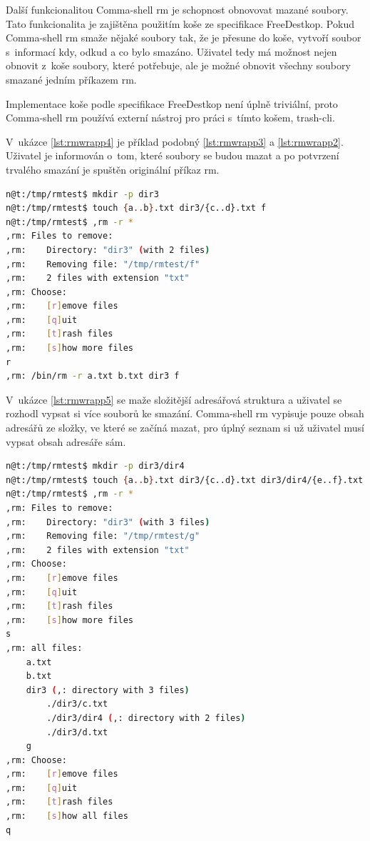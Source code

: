 \documentclass[thesis=M,czech]{FITthesis}[2012/06/26]
\begin{document}
Další funkcionalitou Comma-shell rm je schopnost obnovovat mazané soubory. Tato funkcionalita je zajištěna použitím koše ze specifikace FreeDestkop. Pokud Comma-shell rm smaže nějaké soubory tak, že je přesune do koše, vytvoří soubor s~informací kdy, odkud a co bylo smazáno. Uživatel tedy má možnost nejen obnovit z~koše soubory, které potřebuje, ale je možné obnovit všechny soubory smazané jedním příkazem rm.

Implementace koše podle specifikace FreeDestkop není úplně triviální, proto Comma-shell rm používá externí nástroj pro práci s~tímto košem, trash-cli.


V~ukázce \ref{lst:rmwrapp4} je příklad podobný \ref{lst:rmwrapp3} a \ref{lst:rmwrapp2}. Uživatel je informován o~tom, které soubory se budou mazat a po potvrzení trvalého smazání je spuštěn originální příkaz rm.

\begin{minipage}{\linewidth}
\begin{lstlisting}[language=bash, caption={rm s~}, label={lst:rmwrapp4}]
n@t:/tmp/rmtest$ mkdir -p dir3
n@t:/tmp/rmtest$ touch {a..b}.txt dir3/{c..d}.txt f
n@t:/tmp/rmtest$ ,rm -r *
,rm: Files to remove:
,rm:    Directory: "dir3" (with 2 files)
,rm:    Removing file: "/tmp/rmtest/f"
,rm:    2 files with extension "txt"
,rm: Choose:
,rm:    [r]emove files
,rm:    [q]uit
,rm:    [t]rash files
,rm:    [s]how more files
r
,rm: /bin/rm -r a.txt b.txt dir3 f
\end{lstlisting}
\end{minipage}


V~ukázce \ref{lst:rmwrapp5} se maže složitější adresářová struktura a uživatel se rozhodl vypsat si více souborů ke smazání. Comma-shell rm vypisuje pouze obsah adresářů ze složky, ve které se začíná mazat, pro úplný seznam si už uživatel musí vypsat obsah adresáře sám.

\begin{minipage}{\linewidth}
\begin{lstlisting}[language=bash, caption={rm s~}, label={lst:rmwrapp5}]
n@t:/tmp/rmtest$ mkdir -p dir3/dir4
n@t:/tmp/rmtest$ touch {a..b}.txt dir3/{c..d}.txt dir3/dir4/{e..f}.txt g
n@t:/tmp/rmtest$ ,rm -r *
,rm: Files to remove:
,rm:    Directory: "dir3" (with 3 files)
,rm:    Removing file: "/tmp/rmtest/g"
,rm:    2 files with extension "txt"
,rm: Choose:
,rm:    [r]emove files
,rm:    [q]uit
,rm:    [t]rash files
,rm:    [s]how more files
s
,rm: all files:
    a.txt
    b.txt
    dir3 (,: directory with 3 files)
        ./dir3/c.txt
        ./dir3/dir4 (,: directory with 2 files)
        ./dir3/d.txt
    g
,rm: Choose:
,rm:    [r]emove files
,rm:    [q]uit
,rm:    [t]rash files
,rm:    [s]how all files
q
\end{lstlisting}
\end{minipage}
\end{document}
